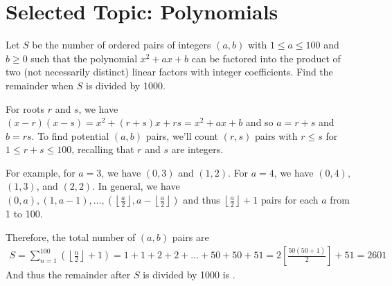 


\setcounter{secnumdepth}{0} 



\pagestyle{empty}
\sloppy
\maketitle

\section{Selected Topic: Polynomials}

\begin{problem}[A][3][AIME I 2018/1]
    Let \( S \) be the number of ordered pairs of integers \( (a, b) \) with \( 1 \leq a \leq 100 \) and \( b \geq 0 \) such that the polynomial \( x^2 + ax + b \) can be factored into the product of two (not necessarily distinct) linear factors with integer coefficients. Find the remainder when \( S \) is divided by 1000.
\end{problem}

\begin{solution}[601]
    For roots $r$ and $s$, we have \((x-r)(x-s)=x^2+(r+s)x+rs=x^2+ax+b\) and so $a=r+s$ and $b=rs$. To find potential $(a,b)$ pairs, we'll count $(r,s)$ pairs with $r \leq s$ for $1 \leq r+s \leq 100$, recalling that $r$ and $s$ are integers.

    For example, for $a=3$, we have $(0,3)$ and $(1,2)$. For $a=4$, we have $(0,4)$, $(1,3)$, and $(2,2)$. In general, we have $(0,a), (1, a-1),\dots, \left( \left\lfloor\frac{a}{2}\right\rfloor, a - \left\lfloor\frac{a}{2}\right\rfloor \right)$ and thus $\left\lfloor\frac{a}{2}\right\rfloor + 1$ pairs for each $a$ from 1 to 100.
        
    Therefore, the total number of $(a,b)$ pairs are
    \begin{align*}
        S = \sum_{n=1}^{100} \left( \left\lfloor\frac{n}{2}\right\rfloor + 1 \right) = 1 + 1 +2+2+\dots+50+50+51=2\left[\frac{50(50+1)}{2}\right]+51 = 2601
    \end{align*}
    And thus the remainder after $S$ is divided by 1000 is .
\end{solution}

